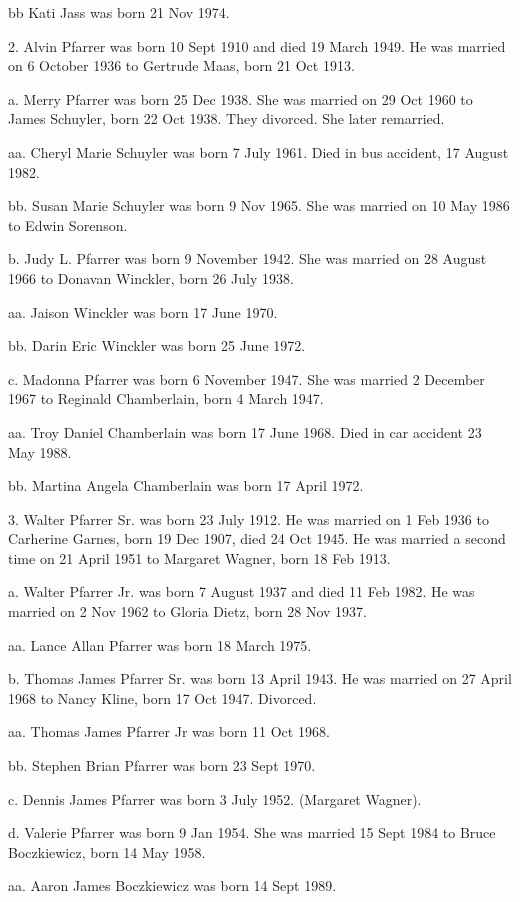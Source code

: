 \documentclass[a4paper]{article}
\begin{document}
bb Kati Jass was born 21 Nov 1974.

2. Alvin Pfarrer was born 10 Sept 1910 and died 19 March 1949.  He was married on 6 October 1936 to Gertrude Maas, born 21 Oct 1913.  

a. Merry Pfarrer was born 25 Dec 1938.   She was married on 29 Oct 1960 to James Schuyler, born 22 Oct 1938.  They divorced.  She later remarried.

aa. Cheryl Marie Schuyler was born 7 July 1961.  Died in bus accident, 17 August 1982.

bb. Susan Marie Schuyler was born 9 Nov 1965.  She was married on 10 May 1986 to Edwin Sorenson.

b. Judy L. Pfarrer was born 9 November 1942.  She was married on 28 August 1966 to Donavan Winckler, born 26 July 1938.

aa. Jaison Winckler was born 17 June 1970.

bb. Darin Eric Winckler was born 25 June 1972.

c. Madonna Pfarrer was born 6 November 1947.  She was married 2 December 1967 to Reginald Chamberlain, born 4 March 1947.

aa. Troy Daniel Chamberlain was born 17 June 1968.  Died in car accident 23 May 1988.

bb. Martina Angela Chamberlain was born 17 April 1972.

3. Walter Pfarrer Sr. was born 23 July 1912.  He was married on 1 Feb 1936 to Carherine Garnes, born 19 Dec 1907, died 24 Oct 1945.  He was married a second time on 21 April 1951 to Margaret Wagner, born 18 Feb 1913.

a. Walter Pfarrer Jr. was born 7 August 1937 and died 11 Feb 1982. He was married on 2 Nov 1962 to Gloria Dietz, born 28 Nov 1937.

aa. Lance Allan Pfarrer was born 18 March 1975.

b. Thomas James Pfarrer Sr. was born 13 April 1943.  He was married on 27 April 1968 to Nancy Kline, born 17 Oct 1947. Divorced.

aa. Thomas James Pfarrer Jr was born 11 Oct 1968.

bb. Stephen Brian Pfarrer was born 23 Sept 1970.

c. Dennis James Pfarrer was born 3 July 1952.  (Margaret Wagner).

d. Valerie Pfarrer was born 9 Jan 1954.  She was married 15 Sept 1984 to Bruce Boczkiewicz, born 14 May 1958.

aa. Aaron James Boczkiewicz was born 14 Sept 1989.
\end{document}
